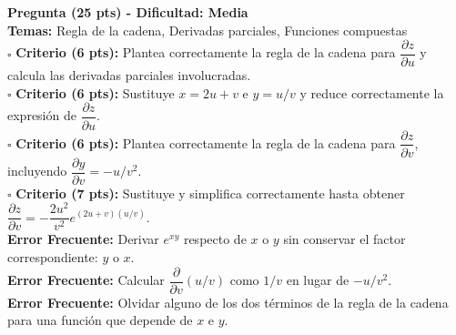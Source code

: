 \documentclass[12pt]{article}
\newenvironment{pregunta}[4]{
  \vspace{0.3cm}\noindent\textbf{Pregunta (#2 pts) - Dificultad: #3}\\
  \textbf{Temas:} #4\\[0.2cm]
}{
  \vspace{0.3cm}
}
\newcommand{\criterio}[2]{
  \noindent $\square$ \textbf{Criterio (#2 pts):} #1 \\
}
\newcommand{\errorfrecuente}[1]{
  \noindent \textbf{Error Frecuente:} #1 \\
}
\begin{document}
\begin{pregunta}{examen-mv-2024-p1}{25}{Media}{Regla de la cadena, Derivadas parciales, Funciones compuestas}
\criterio{Plantea correctamente la regla de la cadena para $\dfrac{\partial z}{\partial u}$ y calcula las derivadas parciales involucradas.}{6}
\criterio{Sustituye $x=2u+v$ e $y=u/v$ y reduce correctamente la expresión de $\dfrac{\partial z}{\partial u}$.}{6}
\criterio{Plantea correctamente la regla de la cadena para $\dfrac{\partial z}{\partial v}$, incluyendo $\dfrac{\partial y}{\partial v}=-u/v^2$.}{6}
\criterio{Sustituye y simplifica correctamente hasta obtener $\dfrac{\partial z}{\partial v}=-\dfrac{2u^2}{v^2}e^{(2u+v)(u/v)}$.}{7}

\errorfrecuente{Derivar $e^{xy}$ respecto de $x$ o $y$ sin conservar el factor correspondiente: $y$ o $x$.}
\errorfrecuente{Calcular $\dfrac{\partial}{\partial v}(u/v)$ como $1/v$ en lugar de $-u/v^2$.}
\errorfrecuente{Olvidar alguno de los dos términos de la regla de la cadena para una función que depende de $x$ e $y$.}
\end{pregunta}
\end{document}
